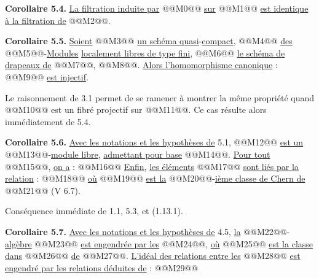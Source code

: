 
\textbf{Corollaire 5.4.} \uline{La filtration induite par} @@M0@@ \uline{sur} @@M1@@ \uline{est identique à la filtration de} @@M2@@.

\textbf{Corollaire 5.5.} \uline{Soient} @@M3@@ \uline{un schéma quasi}-\uline{compact}, @@M4@@ \uline{des} @@M5@@-\uline{Modules} \uline{localement libres de type fini}, @@M6@@ \uline{le schéma de drapeaux de} @@M7@@, @@M8@@. \uline{Alors l'homomorphisme canonique} :
@@M9@@
\uline{est injectif}.

Le raisonnement de 3.1 permet de se ramener à montrer la même propriété quand @@M10@@ est un fibré projectif sur @@M11@@. Ce cas résulte alors immédiatement de 5.4.

\textbf{Corollaire 5.6.} \uline{Avec les notations et les hypothèses de} 5.1, @@M12@@ \uline{est un} @@M13@@-\uline{module libre}, \uline{admettant pour base} @@M14@@. \uline{Pour tout} @@M15@@, \uline{on a} :
@@M16@@
\uline{Enfin}, \uline{les éléments} @@M17@@ \uline{sont liés par la relation} :
@@M18@@
\uline{où} @@M19@@ \uline{est la} @@M20@@-\uline{ième classe de Chern de} @@M21@@ (V 6.7).

Conséquence immédiate de 1.1, 5.3, et (1.13.1).

\textbf{Corollaire 5.7.} \uline{Avec les notations et les hypothèses de} 4.5, \uline{la} @@M22@@-\uline{algèbre} @@M23@@ \uline{est engendrée par les} @@M24@@, \uline{où} @@M25@@ \uline{est la classe dans} @@M26@@ \uline{de} @@M27@@. \uline{L'idéal des relations entre les} @@M28@@ \uline{est engendré par les relations déduites de} :
@@M29@@
